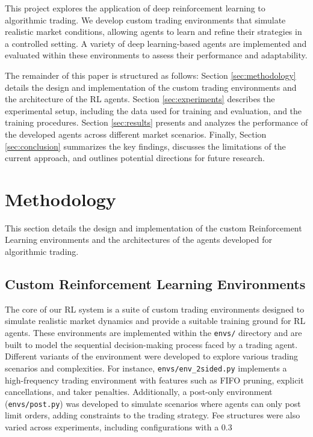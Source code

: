 \documentclass{IEEEtran}
\begin{document}
This project explores the application of deep reinforcement learning to algorithmic trading. We develop custom trading environments that simulate realistic market conditions, allowing agents to learn and refine their strategies in a controlled setting. A variety of deep learning-based agents are implemented and evaluated within these environments to assess their performance and adaptability.

The remainder of this paper is structured as follows: Section \ref{sec:methodology} details the design and implementation of the custom trading environments and the architecture of the RL agents. Section \ref{sec:experiments} describes the experimental setup, including the data used for training and evaluation, and the training procedures. Section \ref{sec:results} presents and analyzes the performance of the developed agents across different market scenarios. Finally, Section \ref{sec:conclusion} summarizes the key findings, discusses the limitations of the current approach, and outlines potential directions for future research.

\section{Methodology}
This section details the design and implementation of the custom Reinforcement Learning environments and the architectures of the agents developed for algorithmic trading.

\subsection{Custom Reinforcement Learning Environments}
The core of our RL system is a suite of custom trading environments designed to simulate realistic market dynamics and provide a suitable training ground for RL agents. These environments are implemented within the \texttt{envs/} directory and are built to model the sequential decision-making process faced by a trading agent. Different variants of the environment were developed to explore various trading scenarios and complexities. For instance, \texttt{envs/env\_2sided.py} implements a high-frequency trading environment with features such as FIFO pruning, explicit cancellations, and taker penalties. Additionally, a post-only environment (\texttt{envs/post.py}) was developed to simulate scenarios where agents can only post limit orders, adding constraints to the trading strategy. Fee structures were also varied across experiments, including configurations with a 0.3%
\end{document}

